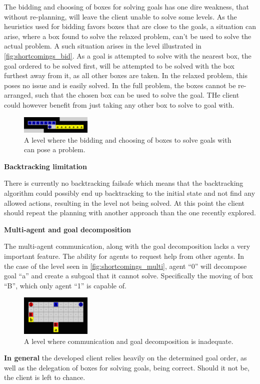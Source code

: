 \documentclass[Main]{subfiles}
\begin{document}
The bidding and choosing of boxes for solving goals has one dire weakness, that without re-planning, will leave the client unable to solve some levels. As the heuristics used for bidding favors boxes that are close to the goals, a situation can arise, where a box found to solve the relaxed problem, can't be used to solve the actual problem. A such situation arises in the level illustrated in \autoref{fig:shortcomings_bid}. As a goal is attempted to solve with the nearest box, the goal ordered to be solved first, will be attempted to be solved with the box furthest away from it, as all other boxes are taken. In the relaxed problem, this poses no issue and is easily solved. In the full problem, the boxes cannot be re-arranged, such that the chosen box can be used to solve the goal. THe client could however benefit from just taking any other box to solve to goal with. 
\begin{figure}[h!]
    \centering
    \includegraphics[width=0.3\textwidth]{shortcomings.png}
    \caption{A level where the bidding and choosing of boxes to solve goals with can pose a problem.}
    \label{fig:shortcomings_bid}
\end{figure}



\textbf{Backtracking limitation}

There is currently no backtracking failsafe which means that the backtracking algorithm could possibly end up backtracking to the initial state and not find any allowed actions, resulting in the level not being solved. 
At this point the client should repeat the planning with another approach than the one recently explored. 



\textbf{Multi-agent and goal decomposition}

The multi-agent communication, along with the goal decomposition lacks a very important feature. The ability for agents to request help from other agents. In the case of the level seen in \autoref{fig:shortcomings_multi}, agent ``0'' will decompose goal ``a'' and create a subgoal that it cannot solve. Specifically the moving of box ``B'', which only agent ``1'' is capable of. 
\begin{figure}[h!]
    \centering
    \includegraphics[width=0.3\textwidth]{shortcomings_multi.png}
    \caption{A level where communication and goal decomposition is inadequate.}
    \label{fig:shortcomings_multi}
\end{figure}



\textbf{In general} the developed client relies heavily on the determined goal order, as well as the delegation of boxes for solving goals, being correct. Should it not be, the client is left to chance. 
\end{document}
